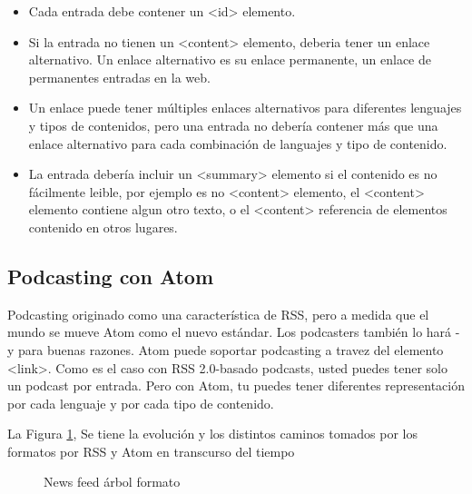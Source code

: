 \begin{itemize}

\item Cada entrada debe contener un <id> elemento.
\item Si la entrada no tienen un <content> elemento, deberia tener un enlace 
alternativo.
Un enlace alternativo es su enlace permanente, un enlace de permanentes entradas
en la web.
\item Un enlace puede tener m\'{u}ltiples enlaces alternativos para diferentes 
lenguajes y tipos de contenidos, pero una entrada no deber\'{i}a contener 
m\'{a}s que una enlace alternativo para cada combinaci\'{o}n de languajes y tipo
de contenido.
\item La entrada deber\'{i}a incluir un <summary> elemento si el contenido es no 
f\'{a}cilmente leible, por ejemplo es no <content> elemento, el <content> elemento 
contiene algun otro texto, o el <content> referencia de elementos contenido en otros
lugares.

\end{itemize}

\subsection{Podcasting con Atom}


Podcasting originado como una caracter\'{i}stica de RSS, pero a medida que el 
mundo se mueve Atom como el nuevo est\'{a}ndar. Los podcasters tambi\'{e}n lo
har\'{a} - y para buenas razones. Atom puede soportar podcasting a travez del
elemento <link>. Como es el caso con RSS 2.0-basado podcasts, usted puedes tener
solo un podcast por entrada. Pero con Atom, tu puedes tener diferentes 
representaci\'{o}n por cada lenguaje y por cada tipo de contenido.\cite{johnson2006rss}

La Figura \ref{News feed árbol formato}, Se tiene la evoluci\'{o}n y los distintos
caminos tomados por los formatos por RSS y Atom en transcurso del tiempo

\begin{figure}[!htb]
	\centering
	\caption{News feed árbol formato}
	\label{News feed árbol formato}
\end{figure}
